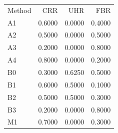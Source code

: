 \begin{tabular}{lrrr}
Method & CRR & UHR & FBR \\
A1 & 0.6000 & 0.0000 & 0.4000 \\
A2 & 0.5000 & 0.0000 & 0.5000 \\
A3 & 0.2000 & 0.0000 & 0.8000 \\
A4 & 0.8000 & 0.0000 & 0.2000 \\
B0 & 0.3000 & 0.6250 & 0.5000 \\
B1 & 0.6000 & 0.5000 & 0.1000 \\
B2 & 0.5000 & 0.5000 & 0.3000 \\
B3 & 0.2000 & 0.0000 & 0.8000 \\
M1 & 0.7000 & 0.0000 & 0.3000 \\
\end{tabular}
